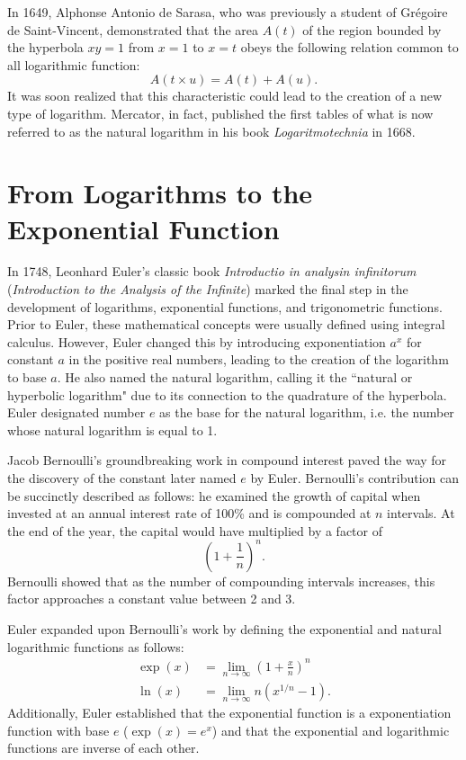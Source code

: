 In 1649, Alphonse Antonio de Sarasa, who was previously a student of Grégoire de Saint-Vincent, demonstrated that the area $A(t)$ of the region bounded by the hyperbola $xy = 1$ from $x = 1$ to $x = t$ obeys the following relation common to all logarithmic function:
\begin{equation*}
    A(t \times u) = A(t) + A(u).
\end{equation*}
It was soon realized that this characteristic could lead to the creation of a new type of logarithm. Mercator, in fact, published the first tables of what is now referred to as the natural logarithm in his book \emph{Logaritmotechnia} in 1668.

\section{From Logarithms to the Exponential Function}

In 1748, Leonhard Euler's classic book \emph{Introductio in analysin infinitorum} (\emph{Introduction to the Analysis of the Infinite}) marked the final step in the development of logarithms, exponential functions, and trigonometric functions. Prior to Euler, these mathematical concepts were usually defined using integral calculus. However, Euler changed this by introducing exponentiation $a^x$ for constant $a$ in the positive real numbers, leading to the creation of the logarithm to base $a$. He also named the natural logarithm, calling it the ``natural or hyperbolic logarithm" due to its connection to the quadrature of the hyperbola. Euler designated number $e$ as the base for the natural logarithm, i.e. the number whose natural logarithm is equal to 1.

Jacob Bernoulli's groundbreaking work in compound interest paved the way for the discovery of the constant later named $e$ by Euler. Bernoulli's contribution can be succinctly described as follows: he examined the growth of capital when invested at an annual interest rate of 100\% and is compounded at $n$ intervals. At the end of the year, the capital would have multiplied by a factor of
\begin{equation*}
    \left(1 + \frac{1}{n} \right)^n.
\end{equation*}
Bernoulli showed that as the number of compounding intervals increases, this factor approaches a constant value between 2 and 3.

Euler expanded upon Bernoulli's work by defining the exponential and natural logarithmic functions as follows:
\begin{align*}
\exp(x) & = \lim_{n \to \infty} \left( 1 + \frac{x}{n} \right)^n \\
\ln(x) & = \lim_{n \to \infty} n (x^{1/n} - 1).
\end{align*}
Additionally, Euler established that the exponential function is a exponentiation function with base $e$ ($\exp(x) = e^x$) and that the exponential and logarithmic functions are inverse of each other.

